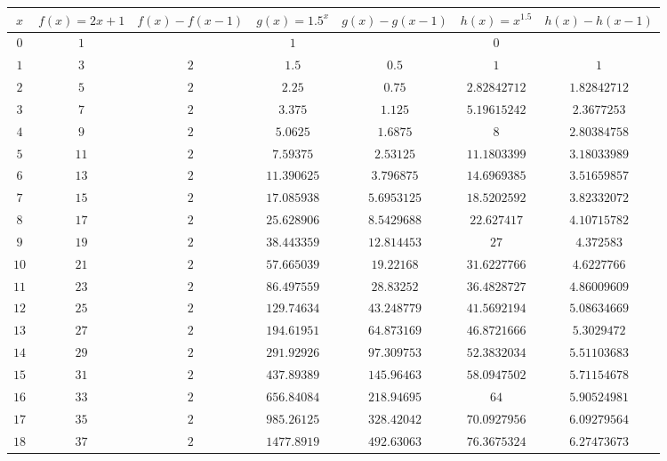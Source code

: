 \documentclass[10pt,a4paper]{article}
\begin{document}
\begin{enumerate}[1.]
\begin{center}
    \begin{longtable}{|c|c|c|c|c|c|c|}
        \hline
        $x$	 & $f(x)=2x+1$ & $f(x)-f(x-1)$ & $g(x)=1.5^x$ & $g(x)-g(x-1)$ & $h(x)=x^{1.5}$ & $h(x)-h(x-1)$ \\ \hline
        \endhead
        $0$ & $1$ & & $1$ & & $0$ &  \\ \hline
        $1$ & $3$ & $2$ & $1.5$ & $0.5$ & $1$ & $1$\\ \hline
        $2$ & $5$ & $2$ & $2.25$ & $0.75$ & $2.82842712$ & $1.82842712$\\ \hline
        $3$ & $7$ & $2$ & $3.375$ & $1.125$ & $5.19615242$ & $2.3677253$\\ \hline
        $4$ & $9$ & $2$ & $5.0625$ & $1.6875$ & $8$ & $2.80384758$\\ \hline
        $5$ & $11$ & $2$ & $7.59375$ & $2.53125$ & $11.1803399$ & $3.18033989$\\ \hline
        $6$ & $13$ & $2$ & $11.390625$ & $3.796875$ & $14.6969385$ & $3.51659857$\\ \hline
        $7$ & $15$ & $2$ & $17.085938$ & $5.6953125$ & $18.5202592$ & $3.82332072$\\ \hline
        $8$ & $17$ & $2$ & $25.628906$ & $8.5429688$ & $22.627417$ & $4.10715782$\\ \hline
        $9$ & $19$ & $2$ & $38.443359$ & $12.814453$ & $27$ & $4.372583$\\ \hline
        $10$ & $21$ & $2$ & $57.665039$ & $19.22168$ & $31.6227766$ & $4.6227766$\\ \hline
        $11$ & $23$ & $2$ & $86.497559$ & $28.83252$ & $36.4828727$ & $4.86009609$\\ \hline
        $12$ & $25$ & $2$ & $129.74634$ & $43.248779$ & $41.5692194$ & $5.08634669$\\ \hline
        $13$ & $27$ & $2$ & $194.61951$ & $64.873169$ & $46.8721666$ & $5.3029472$\\ \hline
        $14$ & $29$ & $2$ & $291.92926$ & $97.309753$ & $52.3832034$ & $5.51103683$\\ \hline
        $15$ & $31$ & $2$ & $437.89389$ & $145.96463$ & $58.0947502$ & $5.71154678$\\ \hline
        $16$ & $33$ & $2$ & $656.84084$ & $218.94695$ & $64$ & $5.90524981$\\ \hline
        $17$ & $35$ & $2$ & $985.26125$ & $328.42042$ & $70.0927956$ & $6.09279564$\\ \hline
        $18$ & $37$ & $2$ & $1477.8919$ & $492.63063$ & $76.3675324$ & $6.27473673$\\ \hline

\end{longtable}
\end{center}
\end{enumerate}
\end{document}
